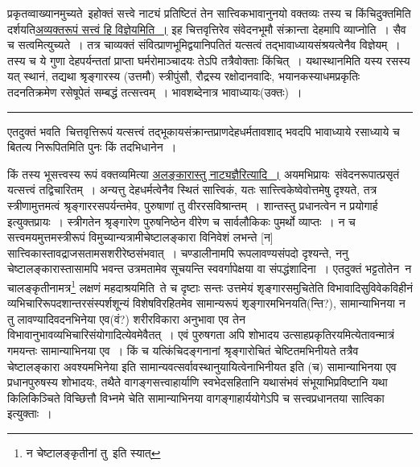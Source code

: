 \documentclass[11pt, openany]{book}
\begin{document}
प्रकृतव्वाख्यानमुच्यते\textendash\ इहोक्तं सत्त्वे नाट्यं प्रतिष्टितं तेन सात्त्विकभावानुनयो वक्तव्यः तस्य च किंचिदुक्तमिति दर्शयति\underline{अव्यक्तरूपं सत्त्वं हि विज्ञेयमिति~।} इह चित्तवृत्तिरेव संवेदनभूमौ संक्रान्ता देहमापि व्याप्नोति~। सैव च सत्वमित्युच्यते~। तत्र चाव्यक्तं संवित्प्राणभूमिद्वयानिपतितं यत्सत्वं तद्भावाध्यायसंश्रयत्वेनैव विज्ञेयम्~। तस्य च ये गुणा देहपर्यन्ततां प्राप्ता घर्मरोमाञ्चादयः तेऽपि तत्रैवोक्ताः किंचित्~। यथास्थानमिति यस्य रसस्य यत् स्थानं, तद्यथा श्रृङ्गारस्य (उत्तमौ) स्त्रीपुंसौ, रौद्रस्य रक्षोदानवादिः, भयानकस्याधमप्रकृतिः तदनतिक्रमेण रसेषूपेतं सम्बद्धं तत्सत्त्वम्~। भावशब्देनात्र भावाध्यायः(उक्तः)~। 

\newpage

\begin{quote}
{}
\end{quote}

\hrule

\vspace{2mm}

एतदुक्तं भवति\textendash\ चित्तवृत्तिरूपं यत्सत्त्वं तद्भूकायसंक्रान्तप्राणदेहधर्मतावशाद् भवदपि भावाध्याये रसाध्याये च बितत्य निरूपितमिति पुनः किं तदभिधानेन~। \\

\begin{sloppypar}
किं तस्य भूसत्त्वस्य रूपं वक्तव्यमित्या \underline{अलङ्कारास्तु नाट्यज्ञैरित्यादि~।} अयमभिप्रायः\textendash\ संवेदनरूपात्प्रसृतं यत्सत्त्वं तद्विचारितम्~। अन्यत्तु देहधर्मत्वेनैव स्थितं सात्त्विकं, यतः सात्त्त्विकेष्वेवोत्तमेषु दृश्यते, तत्र स्त्रीणामुत्तमत्वं श्रृङ्गाररसपर्यन्तमेव, पुरुषाणां तु वीररसविश्रान्तम्~। शान्तस्तु प्रधानत्वेन न प्रयोगार्ह इत्युक्तप्रायः~। स्त्रीगतेन श्रृङ्गारेण पुरुषनिष्ठेन वीरेण च सार्वलौकिकः पुमर्थो व्याप्तः~। न च सत्त्वमयमुत्तमस्त्रीरूपं विमुच्यान्यत्रामीचेष्टालङ्कारा विनिवेशं लभन्ते [न] सात्त्विकास्तावद्राजसतामसशरीरेष्ठसंभवात्~। चण्डालीनामपि रूपलावण्यसंपदो दृश्यन्ते, ननु चेष्टालङ्कारास्तासामपि भवन्त उत्रमतामेव सूचयन्ति स्ववर्गापेक्षया वा संपद्धंशादिना~। एतदुक्तं भट्टतोतेन\textendash\ न चालङ्कृतीनामत्र\renewcommand{\thefootnote}{ * }\footnote{न चेष्टालङ्कृतीनां तु\textendash\ इति स्यात् } लक्षणं महदाश्रयमिति\textendash\ ते च दृष्टाः सन्तः उत्तमेयं शृङ्गारसमुचितेति विभावादिसुविवेकविहीनं व्यभिचारिरूपदशान्तरसंस्पर्शशून्यं विशेषविरहितमेव सामान्यरूपं शृङ्गारमभिनयति(न्ति?), सामान्याभिनया न तु लावण्यादिवदनभिनेया एव(वं?) शरीरविकारा अनुभावा एव तेन विभावानुभावव्यभिचारिसंयोगादित्येवमेवैतत्~। एवं पुरुषगता अपि शोभादय उत्साहप्रकृतिरयमित्येतावन्मात्रं गमयन्तः सामान्याभिनया एव~। किं च यत्किंचिदङ्गनानां श्रृङ्गारोचितं चेष्टितमभिनीयते तत्रैव चेष्टालङ्कारा अवश्यमभिनेया इति सामान्यवत्सर्वावस्थानुयायित्वेनाभिनीयत इति (च) सामान्याभिनया एव प्रधानपुरुषस्य शोभादयः, तथैते वागङ्गसत्त्वाहार्याणि स्वभेदसहितानि यथासंभवं संभूयाभिप्रविष्टानि यथा किलिकिञ्चिते विच्छित्तौ विभ्नमे चेति सामान्याभिनया वागङ्गाहार्ययोगेऽपि च सत्त्वप्रधानतया सात्विका इत्युक्ताः~।
\end{sloppypar}
\end{document}
